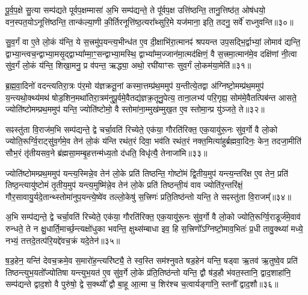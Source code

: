 पू॒र्व॒प॒क्षे सु॒त्या सम्प॑द्यते पूर्वप॒क्षम्मासा॑ अ॒भि सम्प॑द्यन्ते॒ ते पू᳚र्वप॒क्ष उत्ति॑ष्ठन्ति॒ तानु॒त्तिष्ठ॑त॒ ओष॑धयो॒ वन॒स्पत॒यो\-ऽनूत्ति॑ष्ठन्ति॒ तान्क॑ल्या॒णी की॒र्तिरनूत्ति॑ष्ठ॒त्यरा᳚थ्सुरि॒मे यज॑माना॒ इति॒ तदनु॒ सर्वे॑ राध्नुवन्ति॥३०॥

{\anuvakamend[{ए॒तच्छ॒म्बट्कु॑र्वन्ति॒ तेषा॒ञ्चतु॑स्त्रिꣳशच्च॥८॥}]}

सु॒व॒र्गं वा ए॒ते लो॒कं य॑न्ति॒ ये स॒त्त्रमु॑प॒यन्त्य॒भीन्ध॑त ए॒व दी॒क्षाभि॑रा॒त्मानꣴ॑ श्रपयन्त उप॒सद्भि॒र्द्वाभ्यां॒ लोमाव॑ द्यन्ति॒ द्वाभ्या॒न्त्वच॒न्द्वाभ्या॒मसृ॒द्द्वाभ्या᳚म्मा॒ꣳ॒सन्द्वाभ्या॒मस्थि॒ द्वाभ्या᳚म्म॒ज्जान॑मा॒त्मद॑क्षिणं॒ वै स॒त्त्रमा॒त्मान॑मे॒व दक्षि॑णां नी॒त्वा सु॑व॒र्गं लो॒कं य॑न्ति॒ शिखा॒मनु॒ प्र व॑पन्त॒ ऋद्ध्या॒ अथो॒ रघी॑याꣳसः सुव॒र्गं लो॒कम॑या॒मेति॑॥३१॥

{\anuvakamend[{सु॒व॒र्गम्प॑ञ्चा॒शत्॥९॥}]}

ब्र॒ह्म॒वा॒दिनो॑ वदन्त्यतिरा॒त्रः प॑र॒मो य॑ज्ञक्रतू॒नां कस्मा॒त्तम्प्र॑थ॒ममुप॑ य॒न्तीत्ये॒तद्वा अ॑ग्निष्टो॒मम्प्र॑थ॒ममुप॑ य॒न्त्यथो॒क्थ्य॑मथ॑ षोड॒शिन॒मथा॑तिरा॒त्रम॑नुपू॒र्वमे॒वैतद्य॑ज्ञक्र॒तूनु॒पेत्य॒ ताना॒लभ्य॑ परि॒गृह्य॒ सोम॑मे॒वैतत्पिब॑न्त आसते॒ ज्योति॑ष्टोमम्प्रथ॒ममुप॑ यन्ति॒ ज्योति॑ष्टोमो॒ वै स्तोमा॑ना॒म्मुख॑म्मुख॒त ए॒व स्तोमा॒न्प्र यु॑ञ्जते॒ ते॥३२॥

सꣴस्तु॑ता वि॒राज॑म॒भि सम्प॑द्यन्ते॒ द्वे चर्चा॒वति॑ रिच्येते॒ एक॑या॒ गौरति॑रिक्त॒ एक॒यायु॑रू॒नः सु॑व॒र्गो वै लो॒को ज्योति॒रूर्ग्वि॒राट्सु॑व॒र्गमे॒व तेन॑ लो॒कं य॑न्ति रथंत॒रं दिवा॒ भव॑ति रथंत॒रं नक्त॒मित्या॑हुर्ब्रह्मवा॒दिनः॒ केन॒ तदजा॒मीति॑ सौभ॒रं तृ॑तीयसव॒ने ब्र॑ह्मसा॒मम्बृ॒हत्तन्म॑ध्य॒तो द॑धति॒ विधृ॑त्यै॒ तेनाजा॑मि॥३३॥

{\anuvakamend[{त एका॒न्नप॑ञ्चा॒शच्च॑॥10॥}]}

ज्योति॑ष्टोमम्प्रथ॒ममुप॑ यन्त्य॒स्मिन्ने॒व तेन॑ लो॒के प्रति॑ तिष्ठन्ति॒ गोष्टो॑मं द्वि॒तीय॒मुप॑ यन्त्य॒न्तरि॑क्ष ए॒व तेन॒ प्रति॑ तिष्ठ॒न्त्यायु॑ष्टोमं तृ॒तीय॒मुप॑ यन्त्य॒मुष्मि॑न्ने॒व तेन॑ लो॒के प्रति॑ तिष्ठन्ती॒यं वाव ज्योति॑र॒न्तरि॑क्षं॒ गौर॒सावायु॒र्यदे॒तान्थ्स्तोमा॑नुप॒यन्त्ये॒ष्वे॑व तल्लो॒केषु॑ स॒त्त्रिणः॑ प्रति॒तिष्ठ॑न्तो यन्ति॒ ते सꣴस्तु॑ता वि॒राजम्᳚॥३४॥

अ॒भि सम्प॑द्यन्ते॒ द्वे चर्चा॒वति॑ रिच्येते॒ एक॑या॒ गौरति॑रिक्त॒ एक॒यायु॑रू॒नः सु॑व॒र्गो वै लो॒को ज्योति॒रूर्ग्वि॒राडूर्ज॑मे॒वाव॑ रुन्धते॒ ते न क्षु॒धार्ति॒मार्च्छ॒न्त्यक्षो॑धुका भवन्ति॒ क्षुथ्स॑म्बाधा इव॒ हि स॒त्त्रिणो᳚\-ऽग्निष्टो॒माव॒भितः॑ प्र॒धी तावु॒क्थ्या॑ मध्ये॒ नभ्यं॒ तत्तदे॒तत्प॑रि॒यद्दे॑वच॒क्रं यदे॒तेन॑॥३५॥

ष॒ड॒हेन॒ यन्ति॑ देवच॒क्रमे॒व स॒मारो॑ह॒न्त्यरि॑ष्ट्यै॒ ते स्व॒स्ति सम॑श्नुवते षड॒हेन॑ यन्ति॒ षड्वा ऋ॒तव॑ ऋ॒तुष्वे॒व प्रति॑ तिष्ठन्त्युभ॒यतो᳚ज्योतिषा यन्त्युभ॒यत॑ ए॒व सु॑व॒र्गे लो॒के प्र॑ति॒तिष्ठ॑न्तो यन्ति॒ द्वौ ष॑ड॒हौ भ॑वत॒स्तानि॒ द्वाद॒शाहा॑नि॒ सम्प॑द्यन्ते द्वाद॒शो वै पुरु॑षो॒ द्वे स॒क्थ्यौ᳚ द्वौ बा॒हू आ॒त्मा च॒ शिर॑श्च च॒त्वार्यङ्गा॑नि॒ स्तनौ᳚ द्वाद॒शौ॥३६॥

